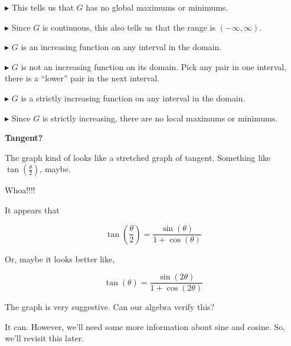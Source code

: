 \documentclass{ximera}
\begin{document}
$\blacktriangleright$ This tells us that $G$ has no global maximums or minimums.  

$\blacktriangleright$ Since $G$ is continuous, this also tells us that the range is $(-\infty, \infty)$.  




$\blacktriangleright$ $G$ is an increasing function on any interval in the domain. 


$\blacktriangleright$ $G$ is not an increasing function on its domain. Pick any pair in one interval, there is a ``lower'' pair in the next interval.


$\blacktriangleright$ $G$ is a strictly increasing function on any interval in the domain. 


$\blacktriangleright$ Since $G$ is strictly increasing, there are no local maximums or minimums.









\begin{observation}   \textbf{\textcolor{-red!75}{Tangent?}} 


The graph kind of looks like a stretched graph of tangent.  Something like $\tan\left( \frac{\theta}{2} \right)$, maybe.






\begin{center}
\end{center}


Whoa!!!! 


It appears that


\[   \tan\left( \frac{\theta}{2} \right)   = \frac{\sin(\theta)}{1 + \cos(\theta)}   \]




Or, maybe it looks better like, 




\[   \tan(\theta)   = \frac{\sin(2\theta)}{1 + \cos(2\theta)}   \]





The graph is very suggestive.  Can our algebra verify this? 


It can.  However, we'll need some more information about sine and cosine.  So, we'll revisit this later.



\end{observation}
\end{document}
